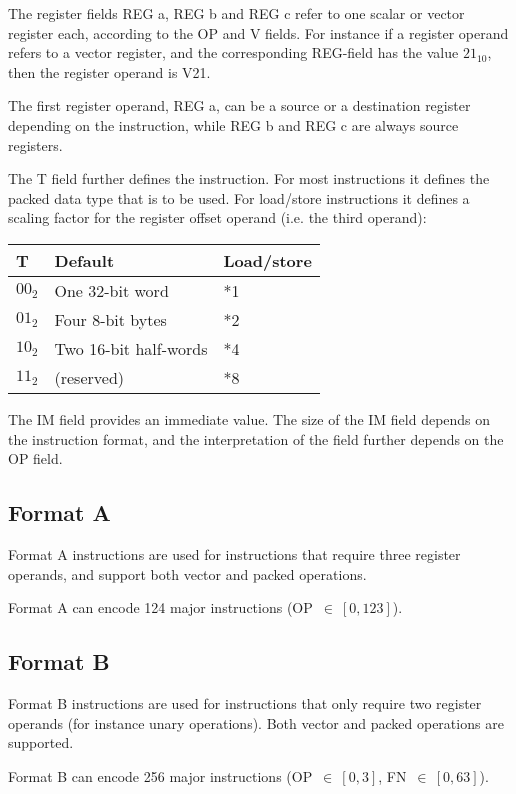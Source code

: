The register fields REG a, REG b and REG c refer to one scalar or vector
register each, according to the OP and V fields. For instance if a register
operand refers to a vector register, and the corresponding REG-field has the
value $21_{10}$, then the register operand is V21.

The first register operand, REG a, can be a source or a destination register
depending on the instruction, while REG b and REG c are always source registers.

The T field further defines the instruction. For most instructions it defines
the packed data type that is to be used. For load/store instructions it
defines a scaling factor for the register offset operand (i.e. the third
operand):

\begin{tabular}{|l|l|l|}
  \hline
  \textbf{T} & \textbf{Default} & \textbf{Load/store} \\
  \hline
  $00_{2}$ & One 32-bit word & *1 \\
  \hline
  $01_{2}$ & Four 8-bit bytes & *2 \\
  \hline
  $10_{2}$ & Two 16-bit half-words & *4 \\
  \hline
  $11_{2}$ & (reserved) & *8 \\
  \hline
\end{tabular}

The IM field provides an immediate value. The size of the IM field depends on
the instruction format, and the interpretation of the field further depends on
the OP field.

\subsection{Format A}

Format A instructions are used for instructions that require three register
operands, and support both vector and packed operations.

Format A can encode 124 major instructions (OP~$\in~[0,123]$).

\subsection{Format B}

Format B instructions are used for instructions that only require two register
operands (for instance unary operations). Both vector and packed operations are
supported.

Format B can encode 256 major instructions (OP~$\in~[0,3]$, FN~$\in~[0,63]$).

